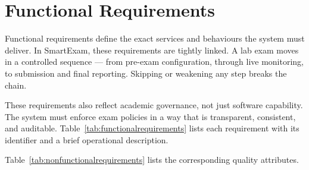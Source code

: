 \section{Functional Requirements}

Functional requirements define the exact services and behaviours the system must deliver. In SmartExam, these requirements are tightly linked. A lab exam moves in a controlled sequence — from pre-exam configuration, through live monitoring, to submission and final reporting. Skipping or weakening any step breaks the chain.

These requirements also reflect academic governance, not just software capability. The system must enforce exam policies in a way that is transparent, consistent, and auditable. Table~\ref{tab:functionalrequirements} lists each requirement with its identifier and a brief operational description.

Table~\ref{tab:nonfunctionalrequirements} lists the corresponding quality attributes.

